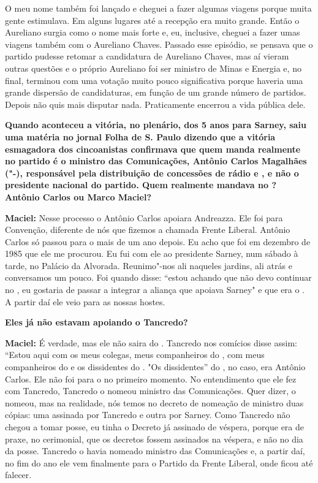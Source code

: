 O meu nome também foi lançado e cheguei a fazer algumas viagens porque
muita gente estimulava. Em alguns lugares até a recepção era muito
grande. Então o Aureliano surgia como o nome mais forte e, eu,
inclusive, cheguei a fazer umas viagens também com o Aureliano Chaves.
Passado esse episódio, se pensava que o partido pudesse retomar a
candidatura de Aureliano Chaves, mas aí vieram outras questões e o
próprio Aureliano foi ser ministro de Minas e Energia e, no final,
terminou com uma votação muito pouco significativa porque haveria uma
grande dispersão de candidaturas, em função de um grande número de
partidos. Depois não quis mais disputar nada. Praticamente encerrou a
vida pública dele.

\textbf{Quando aconteceu a vitória, no plenário, dos 5 anos para Sarney,
saiu uma matéria no jornal Folha de S. Paulo dizendo que a vitória
esmagadora dos cincoanistas confirmava que quem manda realmente no
partido é o ministro das Comunicações, Antônio Carlos Magalhães
("-), responsável pela distribuição de concessões de rádio e , e
não o presidente nacional do partido. Quem realmente mandava no ?
Antônio Carlos ou Marco Maciel? }

\textbf{Maciel:} Nesse processo o Antônio Carlos apoiara Andreazza. Ele
foi para Convenção, diferente de nós que fizemos a chamada Frente
Liberal. Antônio Carlos só passou para o  mais de um ano depois. Eu
acho que foi em dezembro de 1985 que ele me procurou. Eu fui com ele ao
presidente Sarney, num sábado à tarde, no Palácio da Alvorada.
Reunimo"-nos ali naqueles jardins, ali atrás e conversamos um pouco. Foi
quando  disse: ``estou achando que não devo continuar no , eu
gostaria de passar a integrar a aliança que apoiava Sarney" e que era o
. A partir daí ele veio para as nossas hostes.

\textbf{Eles já não estavam apoiando o Tancredo? }

\textbf{Maciel:} É verdade, mas ele não saira do . Tancredo nos
comícios disse assim: ``Estou aqui com os meus colegas, meus
companheiros do , com meus companheiros do  e os dissidentes do
. "Os dissidentes'' do , no caso, era Antônio Carlos. Ele não foi
para o  no primeiro momento. No entendimento que ele fez com
Tancredo, Tancredo o nomeou ministro das Comunicações. Quer dizer, o
nomeou, mas na realidade, nós temos no decreto de nomeação de ministro
duas cópias: uma assinada por Tancredo e outra por Sarney. Como Tancredo
não chegou a tomar posse, eu tinha o Decreto já assinado de véspera,
porque era de praxe, no cerimonial, que os decretos fossem assinados na
véspera, e não no dia da posse. Tancredo o havia nomeado ministro das
Comunicações e, a partir daí, no fim do ano ele vem finalmente para o
Partido da Frente Liberal, onde ficou até falecer.

